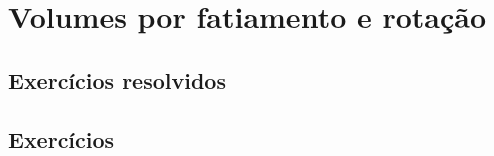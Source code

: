 \emconstrucao

\section{Volumes por fatiamento e rotação}\label{cap_apint_sec_volfat}

\emconstrucao

\subsection*{Exercícios resolvidos}

\emconstrucao

\subsection*{Exercícios}

\emconstrucao